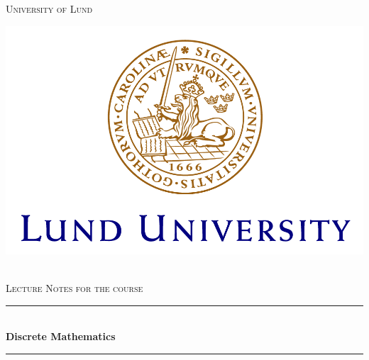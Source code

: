   \begin{titlepage}

    \newcommand{\HRule}{\rule{\linewidth}{0.5mm}} %

    \center %


    \textsc{\LARGE University of Lund}\\[0.5cm] %

    \begin{minipage}[c]{0.8\linewidth}
    \includegraphics[width=\linewidth]{figures/LundUniversity-logo.png}
    \end{minipage} \\
    \textsc{\Large Lecture Notes for the course}\\[0.5cm] %
    \HRule \\[0.4cm]
    { \LARGE \bfseries \sffamily Discrete Mathematics}\\[0.1cm]
    \HRule \\[0.5cm]


\end{titlepage}
